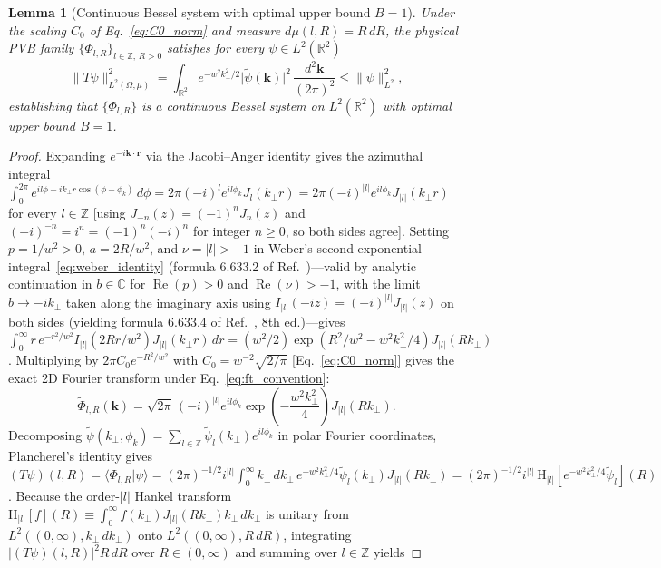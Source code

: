 \documentclass[aps,pra,onecolumn,notitlepage,11pt,tightenlines,nofootinbib,floatfix,longbibliography]{revtex4-2}
\newtheorem{lemma}{Lemma}
\theoremstyle{remark}
\newcommand{\braket}[2]{\langle #1 | #2 \rangle}
\newcommand{\norm}[1]{\lVert #1 \rVert}
\newcommand{\abs}[1]{\lvert #1 \rvert}
\begin{document}
\begin{lemma}[Continuous Bessel system with optimal upper bound $B=1$]
\label{lem:bessel_upper}
Under the scaling $C_0$ of Eq.~\eqref{eq:C0_norm} and measure \mbox{$d\mu(l,R) = R\,dR$}, the physical PVB family $\{\Phi_{l,R}\}_{l\in\mathbb{Z},\,R>0}$ satisfies for every $\psi \in L^2(\mathbb{R}^2)$
\begin{equation}
\norm{T\psi}_{L^2(\Omega,\mu)}^2 = \int_{\mathbb{R}^2} e^{-w^2 k_\perp^2/2}\abs{\widetilde{\psi}(\mathbf{k})}^2\,\frac{d^2\mathbf{k}}{(2\pi)^2} \le \norm{\psi}_{L^2}^2,
\label{eq:bessel_lemma}
\end{equation}
establishing that $\{\Phi_{l,R}\}$ is a continuous Bessel system on $L^2(\mathbb{R}^2)$ with optimal upper bound $B = 1$.
\end{lemma}
\begin{proof}
Expanding $e^{-i\mathbf{k}\cdot\mathbf{r}}$ via the Jacobi--Anger identity gives the azimuthal integral $\int_0^{2\pi} e^{il\phi - ik_\perp r\cos(\phi-\phi_k)}\,d\phi = 2\pi (-i)^l e^{il\phi_k} J_l(k_\perp r) = 2\pi (-i)^{\abs{l}} e^{il\phi_k} J_{\abs{l}}(k_\perp r)$ for every $l \in \mathbb{Z}$ [using $J_{-n}(z) = (-1)^n J_n(z)$ and $(-i)^{-n} = i^n = (-1)^n(-i)^n$ for integer $n \ge 0$, so both sides agree]. Setting $p = 1/w^2 > 0$, $a = 2R/w^2$, and $\nu = \abs{l} > -1$ in Weber's second exponential integral~\eqref{eq:weber_identity} (formula 6.633.2 of Ref.~\cite{Gradshteyn2014})---valid by analytic continuation in $b \in \mathbb{C}$ for $\operatorname{Re}(p) > 0$ and $\operatorname{Re}(\nu) > -1$, with the limit $b \to -i k_\perp$ taken along the imaginary axis using $I_{\abs{l}}(-i z) = (-i)^{\abs{l}} J_{\abs{l}}(z)$ on both sides (yielding formula 6.633.4 of Ref.~\cite{Gradshteyn2014}, 8th ed.)---gives $\int_0^\infty r\,e^{-r^2/w^2} I_{\abs{l}}(2Rr/w^2) J_{\abs{l}}(k_\perp r)\,dr = (w^2/2)\exp(R^2/w^2 - w^2 k_\perp^2/4) J_{\abs{l}}(R k_\perp)$. Multiplying by $2\pi C_0 e^{-R^2/w^2}$ with $C_0 = w^{-2}\sqrt{2/\pi}$ [Eq.~\eqref{eq:C0_norm}] gives the exact 2D Fourier transform under Eq.~\eqref{eq:ft_convention}:
\begin{equation}
\widetilde{\Phi}_{l,R}(\mathbf{k}) = \sqrt{2\pi}\,(-i)^{\abs{l}} e^{il\phi_k} \exp\!\left(-\frac{w^2 k_\perp^2}{4}\right) J_{\abs{l}}(R k_\perp).
\label{eq:pvb_ft}
\end{equation}
Decomposing $\widetilde{\psi}(k_\perp,\phi_k) = \sum_{l\in\mathbb{Z}} \widetilde{\psi}_l(k_\perp)e^{il\phi_k}$ in polar Fourier coordinates, Plancherel's identity gives $(T\psi)(l,R) = \braket{\Phi_{l,R}}{\psi} = (2\pi)^{-1/2} i^{\abs{l}} \allowbreak \int_0^\infty k_\perp\,dk_\perp\, \allowbreak e^{-w^2 k_\perp^2/4}\widetilde{\psi}_l(k_\perp) J_{\abs{l}}(Rk_\perp) = (2\pi)^{-1/2} i^{\abs{l}}\,\mathrm{H}_{\abs{l}}[e^{-w^2 k_\perp^2/4}\widetilde{\psi}_l](R)$. Because the order-$\abs{l}$ Hankel transform $\mathrm{H}_{\abs{l}}[f](R) \equiv \int_0^\infty f(k_\perp) J_{\abs{l}}(R k_\perp) k_\perp\,dk_\perp$ is unitary from $L^2((0,\infty), k_\perp\,dk_\perp)$ onto $L^2((0,\infty), R\,dR)$, integrating $\abs{(T\psi)(l,R)}^2 R\,dR$ over $R \in (0,\infty)$ and summing over $l \in \mathbb{Z}$ yields

\end{proof}
\end{document}

